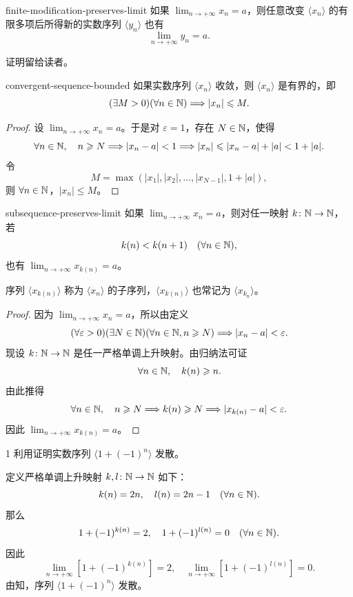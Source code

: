 \begin{myproperty}{}{finite-modification-preserves-limit}
如果 \(\lim_{n\to+\infty}x_n=a\)，则任意改变 \(\langle x_n\rangle\) 的有限多项后所得新的实数序列 \(\langle y_n\rangle\) 也有
\[
\lim_{n\to+\infty}y_n=a.
\]
\end{myproperty}

证明留给读者。

\begin{myproperty}{}{convergent-sequence-bounded}
如果实数序列 \(\langle x_n\rangle\) 收敛，则 \(\langle x_n\rangle\) 是有界的，即
\[
(\exists M>0)(\forall n\in\mathbb{N})\Longrightarrow |x_n|\leqslant M.
\]
\end{myproperty}

\begin{proof}
设 \(\lim_{n\to+\infty}x_n=a\)。于是对 \(\varepsilon=1\)，存在 \(N\in\mathbb{N}\)，使得
\[
\forall n\in\mathbb{N},\quad n\geqslant N\Longrightarrow |x_n-a|<1
\Longrightarrow |x_n|\leqslant |x_n-a|+|a|<1+|a|.
\]
令
\[
M=\max(|x_1|,|x_2|,\dots,|x_{N-1}|,1+|a|),
\]
则 \(\forall n\in\mathbb{N}\)，\(|x_n|\leqslant M\)。
\end{proof}

\begin{myproperty}{}{subsequence-preserves-limit}
如果 \(\lim_{n\to+\infty}x_n=a\)，则对任一映射 \(k\colon\mathbb{N}\to\mathbb{N}\)，若
\[
k(n)<k(n+1)\quad(\forall n\in\mathbb{N}),
\]
也有 \(\lim_{n\to+\infty}x_{k(n)}=a\)。
\end{myproperty}

序列 \(\langle x_{k(n)}\rangle\) 称为 \(\langle x_n\rangle\) 的子序列，\(\langle x_{k(n)}\rangle\) 也常记为 \(\langle x_{k_n}\rangle\)。

\begin{proof}
因为 \(\lim_{n\to+\infty}x_n=a\)，所以由定义
\[
(\forall\varepsilon>0)(\exists N\in\mathbb{N})(\forall n\in\mathbb{N}, n\geqslant N)
\Longrightarrow |x_n-a|<\varepsilon.
\]
现设 \(k\colon\mathbb{N}\to\mathbb{N}\) 是任一严格单调上升映射。由归纳法可证
\[
\forall n\in\mathbb{N},\quad k(n)\geqslant n.
\]
由此推得
\[
\forall n\in\mathbb{N},\quad n\geqslant N\Longrightarrow k(n)\geqslant N
\Longrightarrow |x_{k(n)}-a|<\varepsilon.
\]
因此 \(\lim_{n\to+\infty}x_{k(n)}=a\)。
\end{proof}

\begin{sourceexample}{1}
利用证明实数序列 \(\langle1+(-1)^n\rangle\) 发散。

定义严格单调上升映射 \(k,l\colon\mathbb{N}\to\mathbb{N}\) 如下：
\[
k(n)=2n,\quad l(n)=2n-1\quad(\forall n\in\mathbb{N}).
\]
那么
\[
1+(-1)^{k(n)}=2,\quad 1+(-1)^{l(n)}=0\quad(\forall n\in\mathbb{N}).
\]
因此
\[
\lim_{n\to+\infty}[1+(-1)^{k(n)}]=2,\quad
\lim_{n\to+\infty}[1+(-1)^{l(n)}]=0.
\]
由知，序列 \(\langle1+(-1)^n\rangle\) 发散。
\end{sourceexample}


